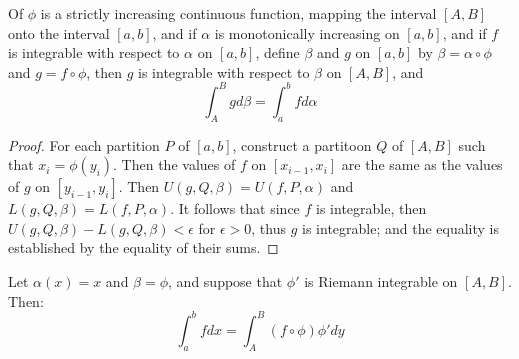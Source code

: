 \begin{theorem}\label{7.2.6}
    Of $\phi$ is a strictly increasing continuous function, mapping the interval
    $[A,B]$ onto the interval  $[a,b]$, and if  $\alpha$ is monotonically
    increasing on  $[a,b]$, and if  $f$ is integrable with respect to  $\alpha$
    on  $[a,b]$, define  $\beta$ and  $g$ on  $[a,b]$ by $\beta=\alpha \circ
    \phi$ and  $g=f \circ \phi$, then $g$ is integrable with respect to  $\beta$
    on  $[A,B]$, and
        \begin{equation}
            \int_{A}^{B}{g} d\beta=\int_{a}^{b}{f} d\alpha
        \end{equation} 
\end{theorem}
\begin{proof}
    For each partition $P$ of  $[a,b]$, construct a partitoon  $Q$ of  $[A,B]$
    such that  $x_i=\phi(y_i)$. Then the values of  $f$ on  $[x_{i-1},x_i]$ are
    the same as the values of $g$ on  $[y_{i-1},y_i]$. Then
    $U(g,Q,\beta)=U(f,P,\alpha)$ and $L(g,Q,\beta)=L(f,P,\alpha)$. It follows
    that since $f$ is integrable, then  $U(g,Q,\beta)-L(g,Q,\beta)<\epsilon$ for  $\epsilon>0$,
    thus $g$ is integrable; and the equality is established by the equality of
    their sums.
\end{proof}
\begin{corollary}
    Let $\alpha(x)=x$ and  $\beta=\phi$, and suppose that  $\phi'$ is Riemann
    integrable on  $[A,B]$. Then:
        \begin{equation}
            \int_{a}^{b}{f} dx=\int_{A}^{B}{(f\circ \phi)\phi' dy}		
        \end{equation} 
\end{corollary}

